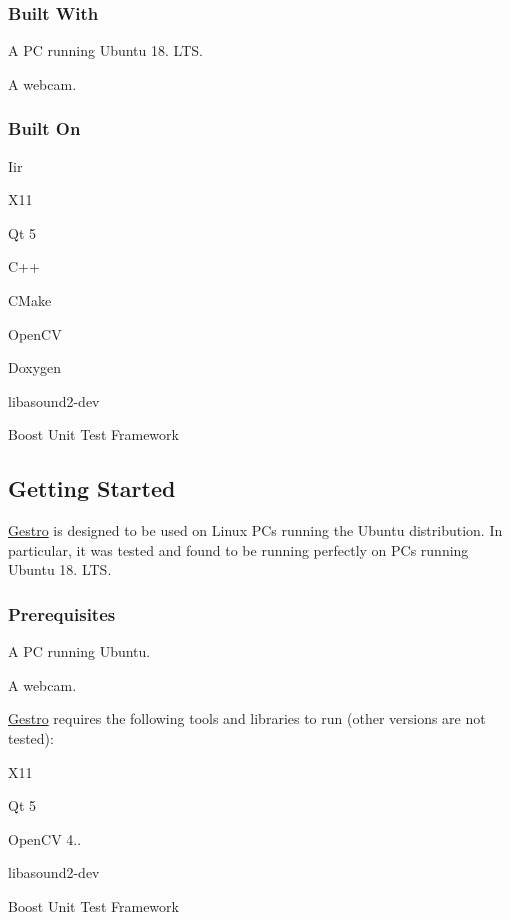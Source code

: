 \subsubsection*{Built With}


\begin{DoxyItemize}
\item A PC running Ubuntu 18. L\+TS.
\item A webcam.
\end{DoxyItemize}

\subsubsection*{Built On}


\begin{DoxyItemize}
\item Iir
\item X11
\item Qt 5
\item C++
\item C\+Make
\item Open\+CV
\item Doxygen
\item libasound2-\/dev
\item Boost Unit Test Framework
\end{DoxyItemize}

\subsection*{Getting Started}

\hyperlink{namespaceGestro}{Gestro} is designed to be used on Linux P\+Cs running the Ubuntu distribution. In particular, it was tested and found to be running perfectly on P\+Cs running Ubuntu 18. L\+TS.

\subsubsection*{Prerequisites}


\begin{DoxyItemize}
\item A PC running Ubuntu.
\item A webcam.
\end{DoxyItemize}

\hyperlink{namespaceGestro}{Gestro} requires the following tools and libraries to run (other versions are not tested)\+:
\begin{DoxyItemize}
\item X11
\item Qt 5
\item Open\+CV 4..
\item libasound2-\/dev
\item Boost Unit Test Framework
\end{DoxyItemize}

